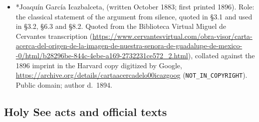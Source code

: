 \begin{itemize}
{milagrosa aparicion de la bellisima imagen de Nuestra Se\~nora de
Guadalupe} (Madrid [in fact Mexico], 1785). Role: eighteenth-century
apparitionist compilation; used for the sequence of the printed
relations, its own admission that nothing was printed in the first
century, the 1666 petition to Alexander~VII, the 1754 brief's incipit,
and Cabrera's account of the 1751 examination. Copy used: John Carter
Brown Library,
\url{https://archive.org/details/coleccindeobrasy00unkn}. Public
domain.
\item *Joaqu\'in Garc\'ia Icazbalceta,  (written
October 1883; first printed 1896). Role: the classical statement of
the argument from silence, quoted in \S3.1 and used in \S3.2, \S6.3
and \S8.2. Quoted from the Biblioteca Virtual Miguel de Cervantes
transcription
(\url{https://www.cervantesvirtual.com/obra-visor/carta-acerca-del-origen-de-la-imagen-de-nuestra-senora-de-guadalupe-de-mexico--0/html/b28296be-844c-4ebe-a169-2732231ce572_2.html}),
collated against the 1896 imprint in the Harvard copy digitized by
Google, \url{https://archive.org/details/cartaacercadelo00icazgoog}
(\texttt{NOT\_IN\_COPYRIGHT}). Public domain; author d.~1894.
\end{itemize}

\subsection*{Holy See acts and official texts}

